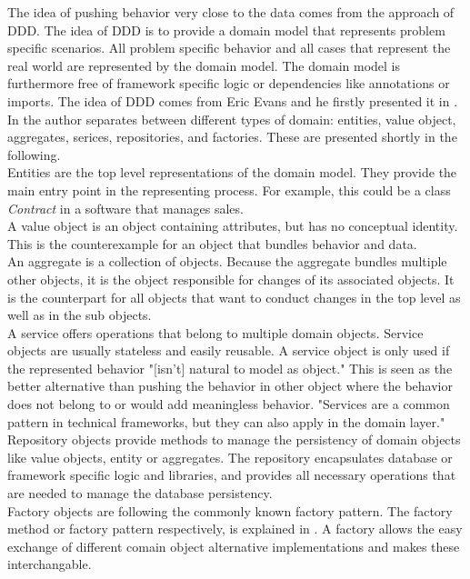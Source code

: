 The idea of pushing behavior very close to the data comes from the approach of \ac{DDD}. The idea of \ac{DDD} is to provide a domain model that represents problem specific scenarios. All problem specific behavior and all cases that represent the real world are represented by the domain model. The domain model is furthermore free of framework specific logic or dependencies like annotations or imports. The idea of \ac{DDD} comes from Eric Evans and he firstly presented it in \cite{dddbook}. 
In \cite{dddbook} the author separates between different types of domain: entities, value object, aggregates, serices, repositories, and factories. These are presented shortly in the following. 
\\

Entities are the top level representations of the domain model. They provide the main entry point in the representing process. For example, this could be a class \textit{Contract} in a software that manages sales. 
\\
A value object is an object containing attributes, but has no conceptual identity. This is the counterexample for an object that bundles behavior and data. 
\\
An aggregate is a collection of objects. Because the aggregate bundles multiple other objects, it is the object responsible for changes of its associated objects. It is the counterpart for all objects that want to conduct changes in the top level as well as in the sub objects. 
\\
A service offers operations that belong to multiple domain objects. Service objects are usually stateless and easily reusable. A service object is only used if the represented behavior "[isn't] natural to model as object." \cite[p. 103]{dddbook} This is seen as the better alternative than pushing the behavior in other object where the behavior does not belong to or would add meaningless behavior. "Services are a common pattern in technical frameworks, but they can also apply in the domain layer." \cite[p. 103]{dddbook}
\\
Repository objects provide methods to manage the persistency of domain objects like value objects, entity or aggregates. The repository encapsulates database or framework specific logic and libraries, and provides all necessary operations that are needed to manage the database persistency.
\\
Factory objects are following the commonly known factory pattern. The factory method or factory pattern respectively, is explained in \cite[p. 121]{gof}. A factory allows the easy exchange of different comain object alternative implementations and makes these interchangable.
